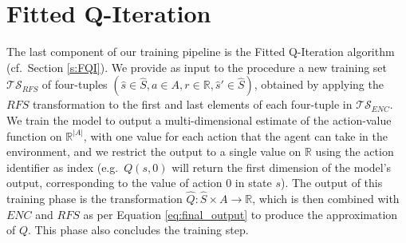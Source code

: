 \section{Fitted Q-Iteration}
The last component of our training pipeline is the Fitted Q-Iteration algorithm 
(cf.\ Section \ref{s:FQI}).
We provide as input to the procedure a new training set $\mathcal{TS}_{RFS}$
of four-tuples $(\hat{s} \in \hat{S}, a \in A, r \in \mathbb{R}, \hat{s}' \in \hat{S})$, 
obtained by applying the $RFS$ transformation to the first and last elements of
each four-tuple in $\mathcal{TS}_{ENC}$. 
We train the model to output a multi-dimensional estimate of the action-value
function on $\mathbb{R}^{|A|}$, with one value for each action that the agent 
can take in the environment, and we restrict the output to a single value on 
$\mathbb{R}$ using the action identifier as index (e.g.\ $Q(s, 0)$ will return 
the first dimension of the model's output, corresponding to the value of action
0 in state $s$). 
The output of this training phase is the transformation 
$\hat{Q}: \hat{S} \times A \rightarrow \mathbb{R}$, which is then combined with 
$ENC$ and $RFS$ as per Equation \eqref{eq:final_output} to produce the 
approximation of $Q$. This phase also concludes the training step.